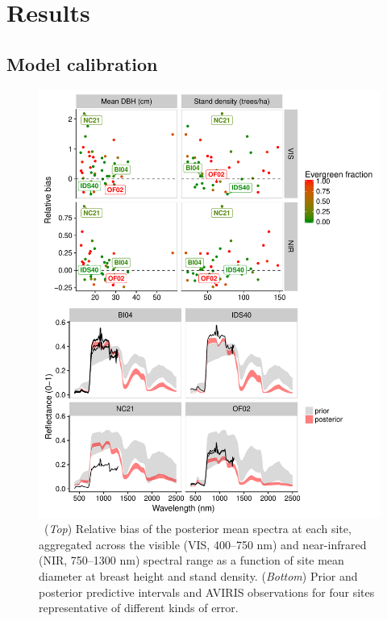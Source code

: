 \section{Results}

\subsection{Model calibration}

\begin{figure}
  \centering
  \includegraphics[width=\textwidth]{figures/spec_validation.pdf}
  \caption{\
    (\textit{Top}) Relative bias of the posterior mean spectra at each site, aggregated across the visible (VIS, 400--750 nm) and near-infrared (NIR, 750--1300 nm) spectral range
    as a function of site mean diameter at breast height and stand density.
    (\textit{Bottom}) Prior and posterior predictive intervals and AVIRIS observations for four sites representative of different kinds of error.
  }\label{fig:bias}
\end{figure}

